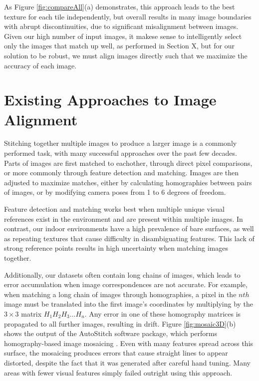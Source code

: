 \documentclass[]{spie}  %
\begin{document}
As Figure \ref{fig:compareAll}(a) demonstrates, this approach leads to
the best texture for each tile independently, but overall results in
many image boundaries with abrupt discontinuities, due to significant
misalignment between images. Given our high number of input images, it
makese sense to intelligently select only the images that match up
well, as performed in Section X, but for our solution to be robust, we
must align images directly such that we maximize the accuracy of each image.



\section{Existing Approaches to Image Alignment}
\label{sec:existingApproaches}
Stitching together multiple images to produce a larger image is a
commonly performed task, with many successful approaches over the past
few decades. Parts of images are first matched to eachother, through
direct pixel comparisons, or more commonly through feature detection
and matching. Images are then adjusted to maximize matches, either by
calculating homographies between pairs of images, or by
modifying camera poses from 1 to 6 degrees of freedom.

Feature detection and matching works best when multiple unique visual
references exist in the environment and are present within multiple
images. In contrast, our indoor environments have a high
prevalence of bare surfaces, as well as repeating textures that cause
difficulty in disambiguating features. This lack of strong reference
points results in high uncertainty when matching images together.

Additionally, our datasets often contain long chains of images, which
leads to error accumulation when image correspondences are not
accurate. For example, when matching a long chain of images through
homographies, a pixel in the $nth$ image must be translated into the
first image's coordinates by multiplying by the $3\times3$ matrix $H_1
H_2 H_3 ... H_n$. Any error in one of these homography matrices is
propagated to all further images, resulting in drift. Figure
\ref{fig:mosaic3D}(b) shows the output of the AutoStitch software
package, which performs homography-based image mosaicing
\cite{autostitch}. Even with many features spread across this surface,
the mosaicing produces errors that cause straight lines to appear distorted, despite the fact that it was generated after careful hand
tuning. Many areas with fewer visual features simply failed outright
using this approach.
\end{document}
